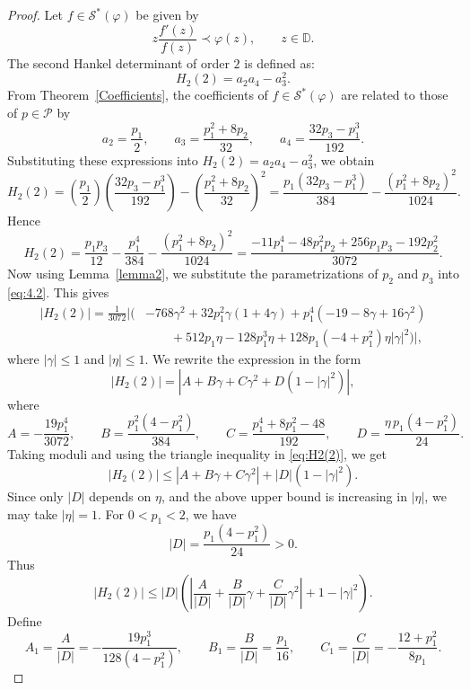 \documentclass[a4paper,12pt,reqno]{amsart} %
\numberwithin{equation}{section}
\theoremstyle{definition}
\begin{document}
\begin{proof}
Let $f \in \mathcal{S}^*(\varphi)$ be given by
\[
z\frac{f'(z)}{f(z)} \prec \varphi(z), \qquad z\in \mathbb{D}.
\]
The second Hankel determinant of order $2$ is defined as:
\[
H_2(2)=a_2a_4-a_3^2.
\]
From Theorem~\ref{Coefficients}, the coefficients of $f \in \mathcal{S}^*(\varphi)$ are related to those of $p \in \mathcal{P}$ by
\[
a_2=\frac{p_1}{2},\qquad
a_3=\frac{p_1^{2}+8p_2}{32},\qquad
a_4=\frac{32p_3-p_1^{3}}{192}.
\]
Substituting these expressions into $H_2(2)=a_2a_4-a_3^2$, we obtain
\[
H_2(2)
=\left(\frac{p_1}{2}\right)\left(\frac{32p_3-p_1^3}{192}\right)
-\left(\frac{p_1^2+8p_2}{32}\right)^2
=\frac{p_1(32p_3-p_1^3)}{384}-\frac{(p_1^2+8p_2)^2}{1024}.
\]
Hence
\begin{equation}\label{eq:4.2}
H_2(2)
=\frac{p_1p_3}{12}-\frac{p_1^4}{384}-\frac{(p_1^2+8p_2)^2}{1024}
=\frac{-11p_1^4-48p_1^2p_2+256p_1p_3-192p_2^2}{3072}.
\end{equation}
Now using Lemma~\ref{lemma2}, we substitute the parametrizations of \(p_2\) and \(p_3\) into \eqref{eq:4.2}. This gives
\begin{equation}\label{eq:4.3}
\begin{aligned}
	|H_2(2)|
	=\frac{1}{3072}\Big|\Big(&-768 \gamma^2 + 32 p_1^2 \gamma (1 + 4 \gamma)
	+ p_1^4 (-19 - 8 \gamma + 16 \gamma^2) \\
	&\qquad + 512 p_1 \eta - 128 p_1^3 \eta
	+ 128 p_1 (-4 + p_1^2)\eta |\gamma|^2 \Big)\Big|,
\end{aligned}
\end{equation}
where $ |\gamma| \le 1 $ and $ |\eta| \le 1 $.
We rewrite the expression in the form
\begin{equation}\label{eq:H2(2)}
|H_2(2)|
=
\left|
A+B\gamma+C\gamma^2+D(1-|\gamma|^2)
\right|,
\end{equation}
where
\[
A=-\frac{19p_1^4}{3072},\qquad
B=\frac{p_1^2(4-p_1^2)}{384},\qquad
C=\frac{p_1^4+8p_1^2-48}{192},\qquad
D=\frac{\eta\,p_1(4-p_1^2)}{24}.
\]
Taking moduli and using the triangle inequality in \eqref{eq:H2(2)}, we get
\[
|H_2(2)|
\le
|A+B\gamma+C\gamma^2|+|D|(1-|\gamma|^2).
\]
Since only \(|D|\) depends on \(\eta\), and the above upper bound is increasing in \(|\eta|\), we may take \(|\eta|=1\). For \(0<p_1<2\), we have
\[
|D|=\frac{p_1(4-p_1^2)}{24}>0.
\]
Thus
\[
|H_2(2)|
\le
|D|
\left(
\left|
\frac{A}{|D|}+\frac{B}{|D|}\gamma+\frac{C}{|D|}\gamma^2
\right|
+1-|\gamma|^2
\right).
\]
Define
\[
A_1=\frac{A}{|D|}
=-\frac{19p_1^3}{128(4-p_1^2)},\qquad
B_1=\frac{B}{|D|}
=\frac{p_1}{16},\qquad
C_1=\frac{C}{|D|}
=-\frac{12+p_1^2}{8p_1}.
\]
\end{proof}
\end{document}
